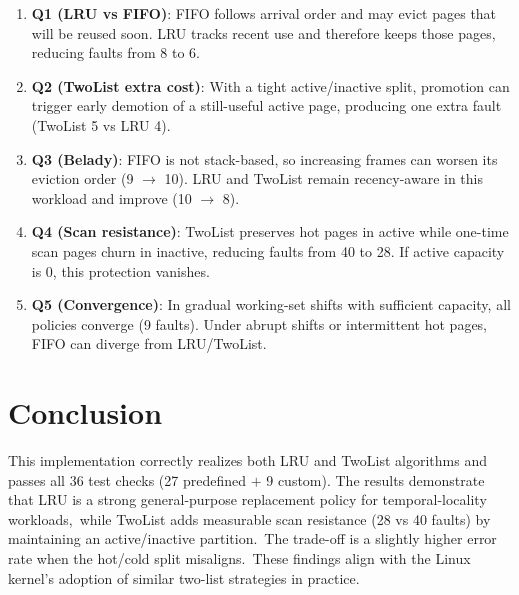\documentclass[11pt]{article}
\begin{document}
\begin{enumerate}
    \item \textbf{Q1 (LRU vs FIFO)}: FIFO follows arrival order and may evict pages that will be reused soon. LRU tracks recent use and therefore keeps those pages, reducing faults from 8 to 6.
    \item \textbf{Q2 (TwoList extra cost)}: With a tight active/inactive split, promotion can trigger early demotion of a still-useful active page, producing one extra fault (TwoList 5 vs LRU 4).
    \item \textbf{Q3 (Belady)}: FIFO is not stack-based, so increasing frames can worsen its eviction order (9 \(\rightarrow\) 10). LRU and TwoList remain recency-aware in this workload and improve (10 \(\rightarrow\) 8).
    \item \textbf{Q4 (Scan resistance)}: TwoList preserves hot pages in active while one-time scan pages churn in inactive, reducing faults from 40 to 28. If active capacity is 0, this protection vanishes.
    \item \textbf{Q5 (Convergence)}: In gradual working-set shifts with sufficient capacity, all policies converge (9 faults). Under abrupt shifts or intermittent hot pages, FIFO can diverge from LRU/TwoList.
\end{enumerate}

\section{Conclusion}
This implementation correctly realizes both LRU and TwoList algorithms and passes all 36 test checks (27 predefined \(+\) 9 custom).
The results demonstrate that LRU is a strong general-purpose replacement policy for temporal-locality workloads,\, while TwoList adds measurable scan resistance (28 vs 40 faults) by maintaining an active/inactive partition.\, The trade-off is a slightly higher error rate when the hot/cold split misaligns.\, These findings align with the Linux kernel's adoption of similar two-list strategies in practice.
\end{document}
